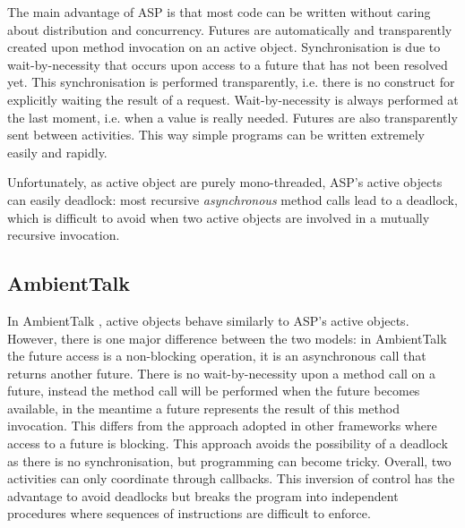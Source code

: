 \smallskip

The main advantage of ASP is that most code can be written without
caring about distribution and concurrency.  Futures are automatically
and transparently created upon method invocation on an active object.
Synchronisation is due to wait-by-necessity that occurs
upon access to a future that has not been resolved yet.
This synchronisation is performed transparently, i.e. 
there is no  construct for explicitly waiting the result of
a request. Wait-by-necessity is always
performed at the last moment, i.e. when a value is really needed.
Futures are also transparently sent between activities. This
way simple programs can be written extremely easily and rapidly.

Unfortunately, as active object are purely mono-threaded,
ASP's active objects can easily deadlock: most recursive
\emph{asynchronous} method calls lead to a deadlock, which is
difficult to avoid when two active objects are involved in a mutually
recursive invocation. 


\subsection{AmbientTalk}
In AmbientTalk \cite{DedeckerCMDM-ecoop06}, active objects behave
similarly to ASP's active objects. However, there is one major difference
between the two models: in AmbientTalk the future access is a
non-blocking operation, it is an asynchronous call that returns
another future.  There is no wait-by-necessity upon a method call on a
future, instead the method call will be performed when the future
becomes available, in the meantime a future represents the result of
this method invocation.  This differs from the approach adopted in
other frameworks where access to a future is blocking.  This approach
avoids the possibility of a deadlock as there is no synchronisation,
but programming can become tricky.
Overall, two activities can only coordinate through  callbacks.  This
inversion of control has the advantage to avoid deadlocks but breaks the program into
independent procedures where sequences of instructions are difficult to enforce.



